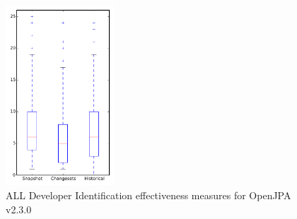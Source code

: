 
\begin{figure}[t]
\centering
\includegraphics[width=0.36\textwidth]{figures/dit/all_openjpa}
\caption{ALL Developer Identification effectiveness measures for OpenJPA v2.3.0}
\label{fig:dit:all:openjpa}
\end{figure}
